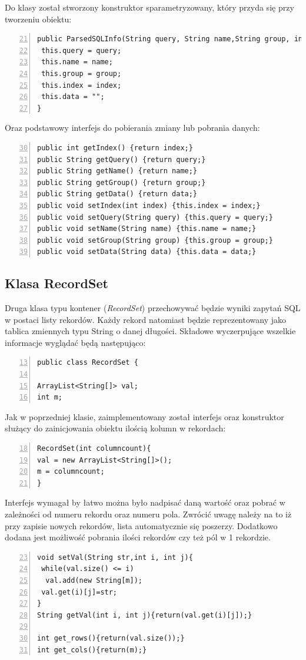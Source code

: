 Do klasy został stworzony konstruktor sparametryzowany, który przyda się przy tworzeniu obiektu:
   
\begin{lstlisting}[numbers=left,firstnumber=21]
public ParsedSQLInfo(String query, String name,String group, int index) {
 this.query = query;
 this.name = name;
 this.group = group;
 this.index = index;
 this.data = "";
}
\end{lstlisting}

Oraz podstawowy interfejs do pobierania zmiany lub pobrania danych:
\begin{lstlisting}[numbers=left,firstnumber=30]
public int getIndex() {return index;}
public String getQuery() {return query;}
public String getName() {return name;}
public String getGroup() {return group;}
public String getData() {return data;}
public void setIndex(int index) {this.index = index;}
public void setQuery(String query) {this.query = query;}
public void setName(String name) {this.name = name;}
public void setGroup(String group) {this.group = group;}
public void setData(String data) {this.data = data;}
\end{lstlisting}

\subsection{Klasa RecordSet}
Druga klasa typu kontener (\emph{RecordSet}) przechowywać będzie wyniki zapytań SQL w postaci listy rekordów. Każdy rekord natomiast będzie reprezentowany jako tablica zmiennych typu String o danej długości. Składowe wyczerpujące wszelkie informacje wyglądać będą następująco:

\begin{lstlisting}[numbers=left,firstnumber=13]
public class RecordSet {

ArrayList<String[]> val;
int m;
\end{lstlisting}

Jak w poprzedniej klasie, zaimplementowany został interfejs oraz konstruktor służący do zainicjowania obiektu ilością kolumn w rekordach:
 \begin{lstlisting}[numbers=left,firstnumber=18]
RecordSet(int columncount){
val = new ArrayList<String[]>();
m = columncount;
}
 \end{lstlisting}

Interfejs wymagał by łatwo można było nadpisać daną wartość oraz pobrać w zależności od numeru rekordu oraz numeru pola. Zwrócić uwagę należy na to iż przy zapisie nowych rekordów, lista automatycznie się poszerzy. Dodatkowo dodana jest możliwość pobrania ilości rekordów czy też pól w 1 rekordzie.
 \begin{lstlisting}[numbers=left,firstnumber=23]
void setVal(String str,int i, int j){
 while(val.size() <= i)
  val.add(new String[m]);
 val.get(i)[j]=str;
}
String getVal(int i, int j){return(val.get(i)[j]);}   

int get_rows(){return(val.size());}
int get_cols(){return(m);}
\end{lstlisting}

